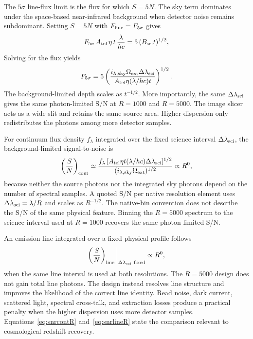 The $5\sigma$ line-flux limit is the flux for which $S=5N$. The sky term dominates under the space-based near-infrared background when detector noise remains subdominant. Setting $S=5N$ with $F_{\rm line}=F_{5\sigma}$ gives
\[
  F_{5\sigma}\,A_{\rm tel}\,\eta\,t\,\frac{\lambda}{hc}=5\,(B_{\rm sci}t)^{1/2},
\]
Solving for the flux yields
\begin{equation}
  F_{5\sigma}=5\left(\frac{i_{\lambda,{\rm sky}}\Omega_{\rm ext}
  \Delta\lambda_{\rm sci}}
  {A_{\rm tel}\eta(\lambda/hc)t}\right)^{1/2}.
  \label{eq:etc}
\end{equation}
The background-limited depth scales as $t^{-1/2}$. More importantly, the same $\Delta\lambda_{\rm sci}$ gives the same photon-limited S/N at $R=1000$ and $R=5000$. The image slicer acts as a wide slit and retains the same source area. Higher dispersion only redistributes the photons among more detector samples.

For continuum flux density $f_\lambda$ integrated over the fixed science interval $\Delta\lambda_{\rm sci}$, the background-limited signal-to-noise is
\begin{equation}
 \left(\frac{S}{N}\right)_{\rm cont}
 \simeq
 \frac{f_\lambda\,[A_{\rm tel}\eta t(\lambda/hc)\Delta\lambda_{\rm sci}]^{1/2}}
 {(i_{\lambda,{\rm sky}}\Omega_{\rm ext})^{1/2}}
 \propto R^{0},
 \label{eq:snrcontR}
\end{equation}
because neither the source photons nor the integrated sky photons depend on the number of spectral samples. A quoted S/N per native resolution element uses $\Delta\lambda_{\rm sci}=\lambda/R$ and scales as $R^{-1/2}$. The native-bin convention does not describe the S/N of the same physical feature. Binning the $R=5000$ spectrum to the science interval used at $R=1000$ recovers the same photon-limited S/N.

An emission line integrated over a fixed physical profile follows
\begin{equation}
 \left(\frac{S}{N}\right)_{\rm line}
 \bigg|_{\Delta\lambda_{\rm sci}\ {\rm fixed}}
 \propto R^0,
 \label{eq:snrlineR}
\end{equation}
when the same line interval is used at both resolutions. The $R=5000$ design does not gain total line photons. The design instead resolves line structure and improves the likelihood of the correct line identity. Read noise, dark current, scattered light, spectral cross-talk, and extraction losses produce a practical penalty when the higher dispersion uses more detector samples. Equations~\eqref{eq:snrcontR} and~\eqref{eq:snrlineR} state the comparison relevant to cosmological redshift recovery.


